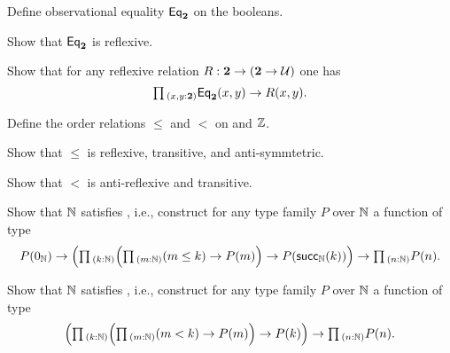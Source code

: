 \begin{exercises}
\begin{subexenum}
  \end{subexenum}
\item \label{ex:obs_bool}
  \begin{subexenum}
  \item Define observational equality $\mathsf{Eq}_\mathbf{2}$ on the booleans.
  \item Show that $\mathsf{Eq}_\mathbf{2}$ is reflexive.
  \item Show that for any reflexive relation $R:\mathbf{2}\to(\mathbf{2}\to \mathcal{U})$ one has
    \begin{equation*}
      \prd{x,y:\bool} \EqBool(x,y)\to R(x,y).
    \end{equation*}
  \end{subexenum}
\item \label{ex:int_order}
  \begin{subexenum}
  \item Define the order relations $\leq$ and $<$ on and ${\mathbb{Z}}$.
  \item Show that $\leq$ is reflexive, transitive, and anti-symmtetric.
  \item Show that $<$ is anti-reflexive and transitive.
  \end{subexenum}
\item
  \begin{subexenum}
  \item Show that ${\mathbb{N}}$ satisfies , i.e., construct for any type family $P$ over ${\mathbb{N}}$ a function of type
    \begin{equation*}
      P(\zeroN) \to \Big(\prd{k:\N}\Big(\prd{m:\N} (m\leq k) \to P(m)\Big)\to P(\succN(k))\Big) \to \prd{n:\N}P(n).
    \end{equation*}
  \item Show that ${\mathbb{N}}$ satisfies , i.e., construct for any type family $P$ over ${\mathbb{N}}$ a function of type
    \begin{equation*}
      \Big(\prd{k:\N} \Big(\prd{m:\N} (m< k) \to P(m)\Big)\to P(k)\Big) \to \prd{n:\N}P(n).
    \end{equation*}
  \end{subexenum}
\begin{comment}
\item
  \begin{subexenum}
  \item For each $i:\mathsf{Fin}(\succN(n))$, define a function

\end{comment}
\end{exercises}
